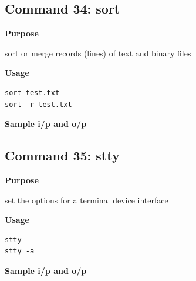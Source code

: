 \documentclass{article}
\begin{document}
\subsection{Command 34: sort} 
\textbf{Purpose}
\begin{flushleft}
 sort or merge records (lines) of text and binary files
\end{flushleft}
\textbf{Usage}
\begin{verbatim}
sort test.txt
sort -r test.txt
\end{verbatim}
\textbf{Sample i/p and o/p}
\begin{figure}[H] 
\end{figure}
\subsection{Command 35: stty} 
\textbf{Purpose}
\begin{flushleft}
 set the options for a terminal device interface
\end{flushleft}
\textbf{Usage}
\begin{verbatim}
stty
stty -a
\end{verbatim}
\textbf{Sample i/p and o/p}
\begin{figure}[H] 
\end{figure}
\end{document}
